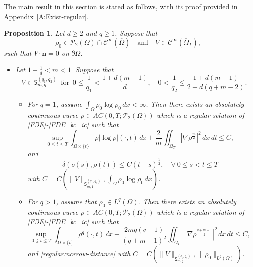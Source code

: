 \documentclass{amsart}
\newtheorem{proposition}[defn]{Proposition}
\numberwithin{equation}{section}
\newcommand{\calC}{{ \mathcal C  }}
\newcommand{\abs}[1]{\left| #1 \right|}
\begin{document}
The main result in this section is stated as follows, with its proof provided in Appendix~\ref{A:Exist-regular}.
\begin{proposition}\label{proposition : regular existence}
Let $d\geq 2$ and $q\geq 1$. Suppose that 
$$
 {\rho}_0\in\mathcal{P}_2(\Omega)\cap \mathcal{C}^\infty(\overline{\Omega}) \quad \mbox{and} \quad
V \in  \calC^\infty (\overline{\Omega}_{T}),
$$
such that $V\cdot\mathbf{n}=0$ on $\partial \Omega$. 

\begin{itemize}
	\item [(i)] Let $1-\frac{1}{d} < m < 1$. Suppose that
	\begin{equation}\label{V:Lq-regular}
V \in \mathsf{S}_{m,q}^{(q_1,q_2)}  \ \text{ for }  \   0 \leq \frac{1}{q_1} < \frac{1+d(m-1)}{d}, \quad 0<\frac{1}{q_2}\leq \frac{1+d(m-1)}{2+d(q+m-2)}.
\end{equation} 
      
      \begin{itemize}
      \item[$\bullet$] For $q=1$, assume $\int_{\Omega} \rho_0 \log \rho_0 \,dx < \infty$. Then there exists an absolutely continuous curve ${\rho}\in
AC(0,T;\mathcal{P}_2(\Omega))$ which is a regular solution of \eqref{FDE}-\eqref{FDE_bc_ic} such that	
      \begin{equation}\label{regular:L1-energy}
 \sup_{0\leq t \leq T}  \int_{\Omega \times \{t\}} \rho \abs{\log \rho} (\cdot, t)\,dx
 +  \frac{2}{m}\iint_{\Omega_T} \left|\nabla \rho^{\frac{m}{2}}\right|^2 \,dx\,dt \le C ,
\end{equation}
and 
\begin{equation}\label{regular:narrow-distance}
\delta(\rho(s),\rho(t))\leq C(t-s)^{\frac{1}{2}}, \quad \forall \ 0\leq s < t \leq T
\end{equation}
with $C=C (\|V\|_{\mathsf{S}_{m,1}^{(q_1, q_2)}}, \, \int_{\Omega} \rho_0 \log \rho_0 \,dx )$.

\item[$\bullet$] For $q>1$, assume that $\rho_0 \in L^q (\Omega)$. Then there exists an absolutely continuous curve ${\rho}\in
AC(0,T;\mathcal{P}_2(\Omega))$ which is a regular solution of \eqref{FDE}-\eqref{FDE_bc_ic} such that	
 \begin{equation}\label{regular:Lq-energy}
 \sup_{0\leq t \leq T}  \int_{\Omega \times \{t\}} \rho^q (\cdot, t) \,dx
 +  \frac{2mq(q-1)}{(q+m-1)^2}\iint_{\Omega_T} \left|\nabla \rho^{\frac{q+m-1}{2}}\right|^2 \,dx\,dt \le C ,
\end{equation}
and \eqref{regular:narrow-distance} with $C = C (\|V\|_{\mathsf{S}_{m,q}^{(q_1, q_2)}}, \, \|\rho_{0}\|_{L^{q} (\Omega)})$.


\end{itemize}
\end{itemize}
\end{proposition}
\end{document}
